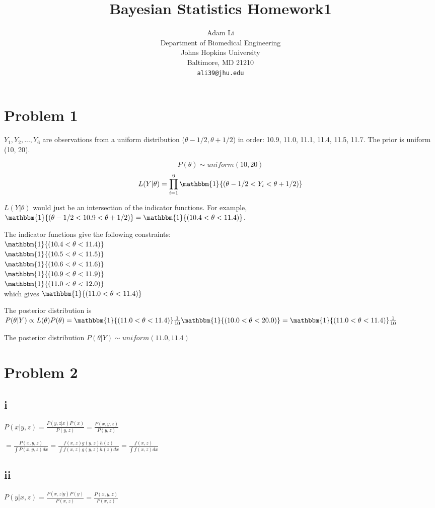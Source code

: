 \documentclass{article}
\title{Bayesian Statistics Homework1}
\author{
  Adam Li \\
  Department of Biomedical Engineering\\
  Johns Hopkins University\\
  Baltimore, MD 21210 \\
  \texttt{ali39@jhu.edu} \\
}
\begin{document}
\maketitle

\section{Problem 1}
$Y_1,Y_2,...,Y_6$ are observations from a uniform distribution ($\theta - 1/2, \theta + 1/2$) in order: 10.9, 11.0, 11.1, 11.4, 11.5, 11.7. The prior is uniform (10, 20).

$$P(\theta) \sim uniform(10,20)$$
$$L(Y|\theta) = \prod_{i=1}^6 \mathbbm{1}{(\theta - 1/2 < Y_i < \theta + 1/2)}$$

$L(Y|\theta)$ would just be an intersection of the indicator functions. For example, $\mathbbm{1}{(\theta - 1/2 < 10.9 < \theta + 1/2)} = \mathbbm{1}{(10.4 < \theta < 11.4)}$.


The indicator functions give the following constraints: \\
$\mathbbm{1}{(10.4 < \theta < 11.4)}$ \\
$\mathbbm{1}{(10.5 < \theta < 11.5)}$ \\
$\mathbbm{1}{(10.6 < \theta < 11.6)}$ \\
$\mathbbm{1}{(10.9 < \theta < 11.9)}$ \\
$\mathbbm{1}{(11.0 < \theta < 12.0)}$ \\
which gives $\mathbbm{1}{(11.0 < \theta < 11.4)}$ 

The posterior distribution is $P(\theta|Y) \propto L(\theta)P(\theta) = \mathbbm{1}{(11.0 < \theta < 11.4)} \frac{1}{10} \mathbbm{1}{(10.0 < \theta < 20.0)} = \mathbbm{1}{(11.0 < \theta < 11.4)} \frac{1}{10}$ 

The posterior distribution $P(\theta|Y) \sim uniform (11.0, 11.4)$

\section{Problem 2}
\subsection{i}
$P(x|y,z) = \frac{P(y,z|x)P(x)}{P(y,z)} = \frac{P(x,y,z)}{P(y,z)}$

$= \frac{P(x,y,z)}{\int\!{P(x,y,z)dx}} = \frac{f(x,z)g(y,z)h(z)}{\int\!{f(x,z)g(y,z)h(z)dx}} = \frac{f(x,z)}{\int\!{f(x,z)dx}}$

\subsection{ii}
$P(y|x,z) = \frac{P(x,z|y)P(y)}{P(x,z)} = \frac{P(x,y,z)}{P(x,z)}$
\end{document}
